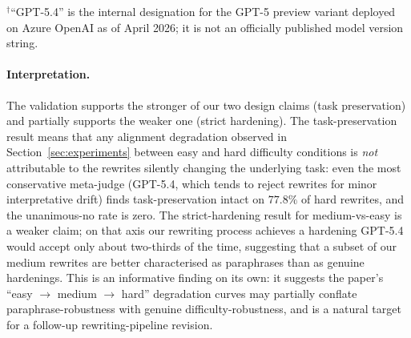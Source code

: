 \begin{table}[!htbp]
\centering
\small
\renewcommand{\arraystretch}{1.1}
\setlength{\tabcolsep}{5pt}
\begin{flushleft}
\footnotesize $^{\dagger}$``GPT-5.4'' is the internal designation for the GPT-5 preview variant deployed on Azure OpenAI as of April 2026; it is not an officially published model version string.
\end{flushleft}
\caption{LLM judge configurations evaluated in this paper. All judges consume the same prompt scaffold (Appendix~\ref{app:prompts}) and produce the same JSON output schema.}
\label{tab:judges}

\end{table}

\paragraph{Interpretation.}
The validation supports the stronger of our two design claims (task preservation) and partially supports the weaker one (strict hardening). The task-preservation result means that any alignment degradation observed in Section~\ref{sec:experiments} between easy and hard difficulty conditions is \emph{not} attributable to the rewrites silently changing the underlying task: even the most conservative meta-judge (GPT-5.4, which tends to reject rewrites for minor interpretative drift) finds task-preservation intact on $77.8\%$ of hard rewrites, and the unanimous-no rate is zero. The strict-hardening result for medium-vs-easy is a weaker claim; on that axis our rewriting process achieves a hardening GPT-5.4 would accept only about two-thirds of the time, suggesting that a subset of our medium rewrites are better characterised as paraphrases than as genuine hardenings. This is an informative finding on its own: it suggests the paper's ``easy $\rightarrow$ medium $\rightarrow$ hard'' degradation curves may partially conflate paraphrase-robustness with genuine difficulty-robustness, and is a natural target for a follow-up rewriting-pipeline revision.

